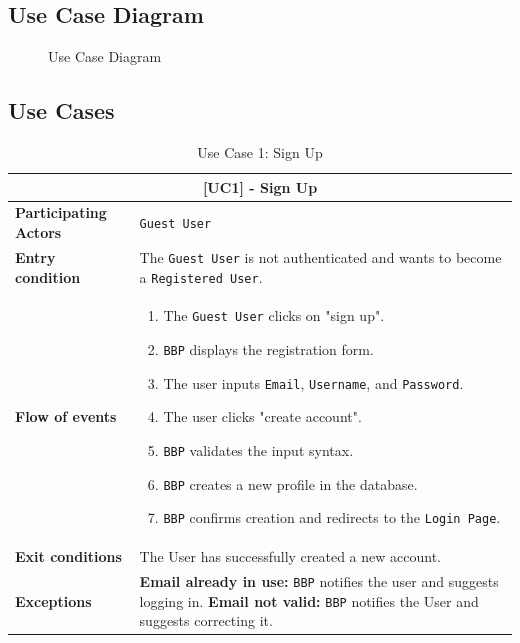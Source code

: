 \label{sec:use_cases}
\subsection{Use Case Diagram}

\begin{figure}[H]
    \centering
    
    \caption{Use Case Diagram}
    \label{fig:use_case_diagram}
\end{figure}

\subsection{Use Cases}

\begin{table}[H]
    \centering
    \begin{tabularx}{\textwidth}{|l|X|}
        \hline
        \multicolumn{2}{|c|}{\textbf{[UC1] - Sign Up}} \\ \hline
        \textbf{Participating Actors} & \texttt{Guest User} \\ \hline
        \textbf{Entry condition}      & The \texttt{Guest User} is not authenticated and wants to become a \texttt{Registered User}. \\ \hline
        \textbf{Flow of events}       & 
        \begin{enumerate}
            \item The \texttt{Guest User} clicks on "sign up".
            \item \texttt{BBP} displays the registration form.
            \item The user inputs \texttt{Email}, \texttt{Username}, and \texttt{Password}.
            \item The user clicks "create account".
            \item \texttt{BBP} validates the input syntax.
            \item \texttt{BBP} creates a new profile in the database.
            \item \texttt{BBP} confirms creation and redirects to the \texttt{Login Page}.
        \end{enumerate} \\ \hline
        \textbf{Exit conditions}      & The User has successfully created a new account. \\ \hline
        \textbf{Exceptions}           & 
        \textbf{Email already in use:} \texttt{BBP} notifies the user and suggests logging in. \newline
        \textbf{Email not valid:} \texttt{BBP} notifies the User and suggests correcting it. \\ \hline
    \end{tabularx}
\caption{Use Case 1: Sign Up}
\label{tab:uc1}
\end{table}

